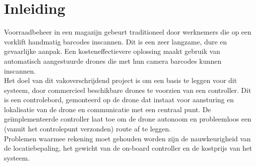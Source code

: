 \chapter*{Inleiding}
Voorraadbeheer in een magazijn gebeurt traditioneel door werknemers die op een vorklift handmatig barcodes inscannen.
Dit is een zeer langzame, dure en gevaarlijke aanpak.
Een kosteneffectievere oplossing maakt gebruik van automatisch aangestuurde drones die met hun camera barcodes kunnen inscannen.\\

Het doel van dit vakoverschrijdend project is om een basis te leggen voor dit systeem, door commercieel beschikbare drones te voorzien van een controller.
Dit is een controlebord, gemonteerd op de drone dat instaat voor aansturing en lokalisatie van de drone en communicatie met een centraal punt.
De geïmplementeerde controller laat toe om de drone autonoom en probleemloos een (vanuit het controlepunt verzonden) route af te leggen.\\

Problemen waarmee rekening moet gehouden worden zijn de nauwkeurigheid van de locatiebepaling, het gewicht van de on-board controller en de kostprijs van het systeem.